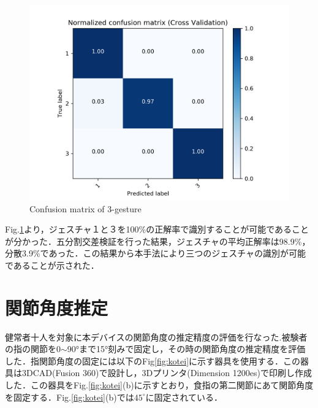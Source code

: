 \begin{figure}[H]
  \centering
  \includegraphics[width=0.8\linewidth]{fig/confusion_matrix}
  \caption{Confusion matrix of 3-gesture}
  \label{fig:matrix}
\end{figure}


Fig.\ref{fig:matrix}より，ジェスチャ１と３を100\%の正解率で識別することが可能であることが分かった．五分割交差検証を行った結果，ジェスチャの平均正解率は98.9\%，分散3.9\%であった．この結果から本手法により三つのジェスチャの識別が可能であることが示された．



\section{関節角度推定}
健常者十人を対象に本デバイスの関節角度の推定精度の評価を行なった.被験者の指の関節を0$\sim$90°まで15°刻みで固定し，その時の関節角度の推定精度を評価した．指関節角度の固定には以下のFig\ref{fig:kotei}に示す器具を使用する．この器具は3DCAD(Fusion 360)で設計し，3Dプリンタ(Dimension 1200es)で印刷し作成した．この器具をFig.\ref{fig:kotei}(b)に示すとおり，食指の第二関節にあて関節角度を固定する．Fig.\ref{fig:kotei}(b)では$45^\circ$に固定されている．



